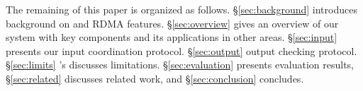 The remaining of this paper is organized as follows. \S\ref{sec:background} 
introduces background on \paxos and RDMA features. \S\ref{sec:overview} gives 
an overview of our \xxx system with key components and its applications in 
other areas. \S\ref{sec:input} presents our input coordination protocol. 
\S\ref{sec:output} output checking protocol. \S\ref{sec:limits} \xxx's 
discusses limitations. \S\ref{sec:evaluation} presents evaluation results, 
\S\ref{sec:related} discusses related work, and \S\ref{sec:conclusion} 
concludes.   